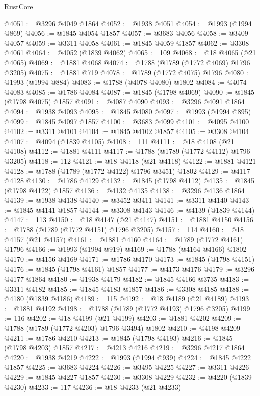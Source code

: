 \begin{lexlean}{RustCore}
\begin{coremodule}
@4051 := @3296 @4049 @1864
@4052 := @1938 @4051
@4054 := @1993 (@1994 @869)
@4056 := @1845 @4054 @1857
@4057 := @3683 @4056
@4058 := @3409 @4057
@4059 := @3311 @4058
@4061 := @1845 @4059 @1857
@4062 := @3308 @4061
@4064 := @4052 (@1839 @4062)
@4065 := 109
@4068 := @18 @4065 (@21 @4065)
@4069 := @1881 @4068
@4074 := @1788 (@1789 (@1772 @4069) @1796 @3205)
@4075 := @1881 @719
@4078 := @1789 (@1772 @4075) @1796
@4080 := @1993 (@1994 @884)
@4083 := @1788 (@4078 @4080) @1802
@4084 := @4074 @4083
@4085 := @1786 @4084
@4087 := @1845 (@1798 @4069)
@4090 := @1845 (@1798 @4075) @1857
@4091 := @4087 @4090
@4093 := @3296 @4091 @1864
@4094 := @1938 @4093
@4095 := @1845 @4080
@4097 := @1993 (@1994 @895)
@4099 := @1845 @4097 @1857
@4100 := @3683 @4099
@4101 := @4095 @4100
@4102 := @3311 @4101
@4104 := @1845 @4102 @1857
@4105 := @3308 @4104
@4107 := @4094 (@1839 @4105)
@4108 := 111
@4111 := @18 @4108 (@21 @4108)
@4112 := @1881 @4111
@4117 := @1788 (@1789 (@1772 @4112) @1796 @3205)
@4118 := 112
@4121 := @18 @4118 (@21 @4118)
@4122 := @1881 @4121
@4128 := @1788 (@1789 (@1772 @4122) @1796 @3451) @1802
@4129 := @4117 @4128
@4130 := @1786 @4129
@4132 := @1845 (@1798 @4112)
@4135 := @1845 (@1798 @4122) @1857
@4136 := @4132 @4135
@4138 := @3296 @4136 @1864
@4139 := @1938 @4138
@4140 := @3452 @3411
@4141 := @3311 @4140
@4143 := @1845 @4141 @1857
@4144 := @3308 @4143
@4146 := @4139 (@1839 @4144)
@4147 := 113
@4150 := @18 @4147 (@21 @4147)
@4151 := @1881 @4150
@4156 := @1788 (@1789 (@1772 @4151) @1796 @3205)
@4157 := 114
@4160 := @18 @4157 (@21 @4157)
@4161 := @1881 @4160
@4164 := @1789 (@1772 @4161) @1796
@4166 := @1993 (@1994 @919)
@4169 := @1788 (@4164 @4166) @1802
@4170 := @4156 @4169
@4171 := @1786 @4170
@4173 := @1845 (@1798 @4151)
@4176 := @1845 (@1798 @4161) @1857
@4177 := @4173 @4176
@4179 := @3296 @4177 @1864
@4180 := @1938 @4179
@4182 := @1845 @4166 @3735
@4183 := @3311 @4182
@4185 := @1845 @4183 @1857
@4186 := @3308 @4185
@4188 := @4180 (@1839 @4186)
@4189 := 115
@4192 := @18 @4189 (@21 @4189)
@4193 := @1881 @4192
@4198 := @1788 (@1789 (@1772 @4193) @1796 @3205)
@4199 := 116
@4202 := @18 @4199 (@21 @4199)
@4203 := @1881 @4202
@4209 := @1788 (@1789 (@1772 @4203) @1796 @3494) @1802
@4210 := @4198 @4209
@4211 := @1786 @4210
@4213 := @1845 (@1798 @4193)
@4216 := @1845 (@1798 @4203) @1857
@4217 := @4213 @4216
@4219 := @3296 @4217 @1864
@4220 := @1938 @4219
@4222 := @1993 (@1994 @939)
@4224 := @1845 @4222 @1857
@4225 := @3683 @4224
@4226 := @3495 @4225
@4227 := @3311 @4226
@4229 := @1845 @4227 @1857
@4230 := @3308 @4229
@4232 := @4220 (@1839 @4230)
@4233 := 117
@4236 := @18 @4233 (@21 @4233)

\end{coremodule}
\end{lexlean}
